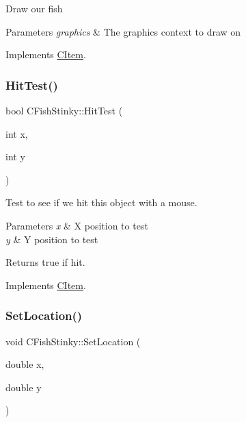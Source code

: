 Draw our fish 
\begin{DoxyParams}{Parameters}
{\em graphics} & The graphics context to draw on \\
\hline
\end{DoxyParams}


Implements \mbox{\hyperlink{class_c_item_a7ef8448d0c4bc53d0f1943a4dc817f6f}{C\+Item}}.

\mbox{\label{class_c_fish_stinky_a5dadb91a76b3d573e3c6fc4e55d7ad58}} 
\subsubsection{\texorpdfstring{HitTest()}{HitTest()}}
{\footnotesize\ttfamily bool C\+Fish\+Stinky\+::\+Hit\+Test (\begin{DoxyParamCaption}\item[{int}]{x,  }\item[{int}]{y }\end{DoxyParamCaption})\hspace{0.3cm}{\ttfamily [virtual]}}

Test to see if we hit this object with a mouse. 
\begin{DoxyParams}{Parameters}
{\em x} & X position to test \\
\hline
{\em y} & Y position to test \\
\hline
\end{DoxyParams}
\begin{DoxyReturn}{Returns}
true if hit. 
\end{DoxyReturn}


Implements \mbox{\hyperlink{class_c_item_a8bd4f5e3f2eb2487125dd435719484e8}{C\+Item}}.

\mbox{\label{class_c_fish_stinky_aef706c721726a98f4e98cd335af2bd00}} 
\subsubsection{\texorpdfstring{SetLocation()}{SetLocation()}}
{\footnotesize\ttfamily void C\+Fish\+Stinky\+::\+Set\+Location (\begin{DoxyParamCaption}\item[{double}]{x,  }\item[{double}]{y }\end{DoxyParamCaption})\hspace{0.3cm}{\ttfamily [virtual]}}



